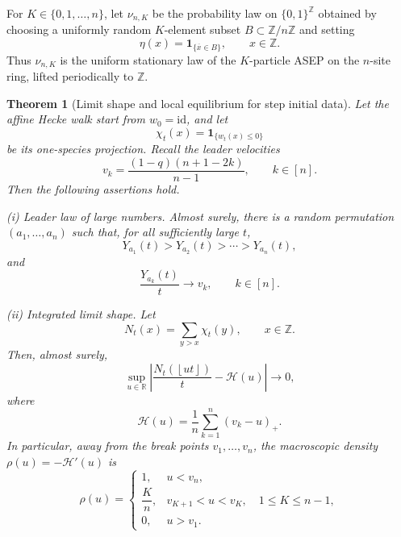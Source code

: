 \documentclass[11pt,a4paper]{amsart}
\newtheorem{theorem}{Theorem}[section]
\theoremstyle{definition}
\theoremstyle{remark}
\numberwithin{equation}{section}
\newcommand{\Z}{\mathbb Z}
\newcommand{\R}{\mathbb R}
\newcommand{\one}{\mathbf 1}
\newcommand{\cH}{\mathcal H}
\newcommand{\id}{\mathrm{id}}
\newcommand{\floor}[1]{\left\lfloor #1\right\rfloor}
\newcommand{\abs}[1]{\left|#1\right|}
\newcommand{\pospart}[1]{\left(#1\right)_{+}}
\newcommand{\modn}[1]{\overline{#1}}
\begin{document}
	For $K\in\{0,1,\ldots,n\}$, let $\nu_{n,K}$ be the probability law on
	$\{0,1\}^{\Z}$ obtained by choosing a uniformly random $K$-element subset
	$B\subset\Z/n\Z$ and setting
	\begin{equation}\label{eq:nu-nK}
		\eta(x)=\one_{\{\modn{x}\in B\}},
		\qquad x\in\Z.
	\end{equation}
	Thus $\nu_{n,K}$ is the uniform stationary law of the $K$-particle ASEP on
	the $n$-site ring, lifted periodically to $\Z$.
	
	\begin{theorem}[Limit shape and local equilibrium for step initial data]
		\label{thm:limit-shape-step}
		Let the affine Hecke walk start from $w_0=\id$, and let
		\begin{equation}\label{eq:chi-from-wt}
			\chi_t(x)=\one_{\{w_t(x)\le0\}}
		\end{equation}
		be its one-species projection.  Recall the leader velocities
		\begin{equation}\label{eq:theorem-velocities}
			v_k=\frac{(1-q)(n+1-2k)}{n-1},
			\qquad k\in[n].
		\end{equation}
		Then the following assertions hold.
		
		\smallskip
		\noindent\emph{(i) Leader law of large numbers.}
		Almost surely, there is a random permutation $(a_1,\ldots,a_n)$ such that,
		for all sufficiently large $t$,
		\begin{equation}\label{eq:eventual-leader-order}
			Y_{a_1}(t)>Y_{a_2}(t)>\cdots>Y_{a_n}(t),
		\end{equation}
		and
		\begin{equation}\label{eq:leader-velocity-limit}
			\frac{Y_{a_k}(t)}{t}\longrightarrow v_k,
			\qquad k\in[n].
		\end{equation}
		
		\smallskip
		\noindent\emph{(ii) Integrated limit shape.}
		Let
		\begin{equation}\label{eq:particle-count}
			N_t(x)=\sum_{y>x}\chi_t(y),
			\qquad x\in\Z.
		\end{equation}
		Then, almost surely,
		\begin{equation}\label{eq:uniform-height-limit}
			\sup_{u\in\R}
			\abs{\frac{N_t(\floor{ut})}{t}-\cH(u)}
			\longrightarrow0,
		\end{equation}
		where
		\begin{equation}\label{eq:limit-height-function}
			\cH(u)=\frac1n\sum_{k=1}^n\pospart{v_k-u}.
		\end{equation}
		In particular, away from the break points $v_1,\ldots,v_n$, the macroscopic
		density $\rho(u)=-\cH'(u)$ is
		\begin{equation}\label{eq:density-profile}
			\rho(u)=
			\begin{cases}
				1,&u<v_n,\\[1mm]
				\dfrac{K}{n},&v_{K+1}<u<v_K,
				\quad 1\le K\le n-1,\\[2mm]
				0,&u>v_1.
			\end{cases}
		\end{equation}
		

\end{theorem}
\end{document}
